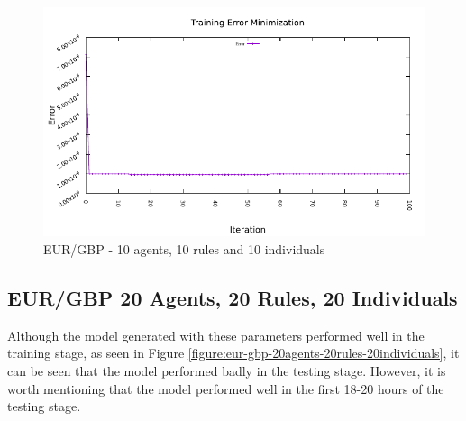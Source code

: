 \begin{figure}[htp]
  \medskip

  \includegraphics[width=.45\textwidth]{img/plots/eur_gbp_h1-10agents-10rules-10ind-100gen_error_minimization.pdf}

  \caption{EUR/GBP - 10 agents, 10 rules and 10 individuals}
  \label{figure:eur-gbp-10agents-10rules-10individuals}
\end{figure}

\newpage

\subsection{EUR/GBP 20 Agents, 20 Rules, 20 Individuals}
\label{results:forecast-eur-gbp-20agents-20rules-20individuals}

Although the model generated with these parameters performed well in the training stage, as seen in Figure \ref{figure:eur-gbp-20agents-20rules-20individuals}, it can be seen that the model performed badly in the testing stage. However, it is worth mentioning that the model performed well in the first 18-20 hours of the testing stage.

